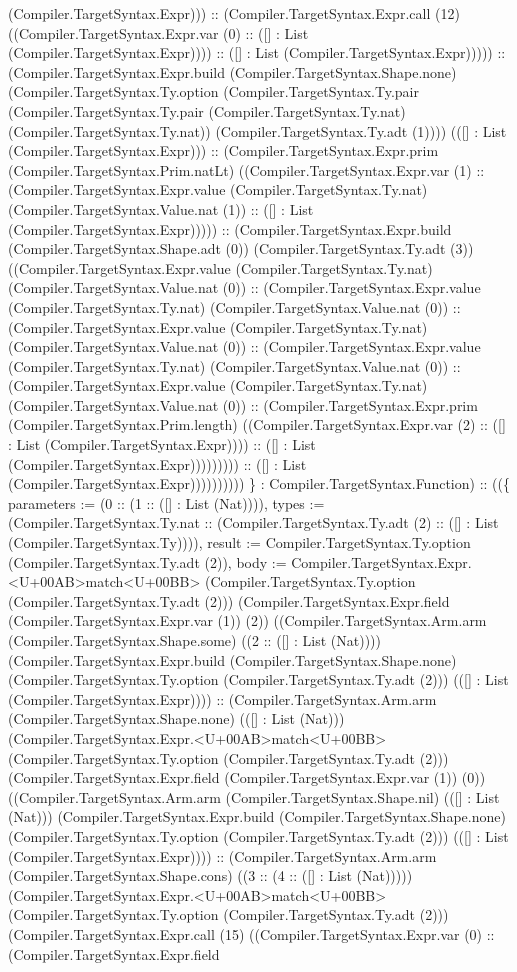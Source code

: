 \documentclass[11pt]{article}
\begin{document}
(Compiler.TargetSyntax.Expr))) :: (Compiler.TargetSyntax.Expr.call (12) ((Compiler.TargetSyntax.Expr.var (0) :: ([] : List (Compiler.TargetSyntax.Expr)))) :: ([] : List (Compiler.TargetSyntax.Expr))))) :: (Compiler.TargetSyntax.Expr.build (Compiler.TargetSyntax.Shape.none) (Compiler.TargetSyntax.Ty.option (Compiler.TargetSyntax.Ty.pair (Compiler.TargetSyntax.Ty.pair (Compiler.TargetSyntax.Ty.nat) (Compiler.TargetSyntax.Ty.nat)) (Compiler.TargetSyntax.Ty.adt (1)))) (([] : List (Compiler.TargetSyntax.Expr))) :: (Compiler.TargetSyntax.Expr.prim (Compiler.TargetSyntax.Prim.natLt) ((Compiler.TargetSyntax.Expr.var (1) :: (Compiler.TargetSyntax.Expr.value (Compiler.TargetSyntax.Ty.nat) (Compiler.TargetSyntax.Value.nat (1)) :: ([] : List (Compiler.TargetSyntax.Expr))))) :: (Compiler.TargetSyntax.Expr.build (Compiler.TargetSyntax.Shape.adt (0)) (Compiler.TargetSyntax.Ty.adt (3)) ((Compiler.TargetSyntax.Expr.value (Compiler.TargetSyntax.Ty.nat) (Compiler.TargetSyntax.Value.nat (0)) :: (Compiler.TargetSyntax.Expr.value (Compiler.TargetSyntax.Ty.nat) (Compiler.TargetSyntax.Value.nat (0)) :: (Compiler.TargetSyntax.Expr.value (Compiler.TargetSyntax.Ty.nat) (Compiler.TargetSyntax.Value.nat (0)) :: (Compiler.TargetSyntax.Expr.value (Compiler.TargetSyntax.Ty.nat) (Compiler.TargetSyntax.Value.nat (0)) :: (Compiler.TargetSyntax.Expr.value (Compiler.TargetSyntax.Ty.nat) (Compiler.TargetSyntax.Value.nat (0)) :: (Compiler.TargetSyntax.Expr.prim (Compiler.TargetSyntax.Prim.length) ((Compiler.TargetSyntax.Expr.var (2) :: ([] : List (Compiler.TargetSyntax.Expr)))) :: ([] : List (Compiler.TargetSyntax.Expr))))))))) :: ([] : List (Compiler.TargetSyntax.Expr)))))))))) \} : Compiler.TargetSyntax.Function) :: ((\{ parameters := (0 :: (1 :: ([] : List (Nat)))), types := (Compiler.TargetSyntax.Ty.nat :: (Compiler.TargetSyntax.Ty.adt (2) :: ([] : List (Compiler.TargetSyntax.Ty)))), result := Compiler.TargetSyntax.Ty.option (Compiler.TargetSyntax.Ty.adt (2)), body := Compiler.TargetSyntax.Expr.<U+00AB>match<U+00BB> (Compiler.TargetSyntax.Ty.option (Compiler.TargetSyntax.Ty.adt (2))) (Compiler.TargetSyntax.Expr.field (Compiler.TargetSyntax.Expr.var (1)) (2)) ((Compiler.TargetSyntax.Arm.arm (Compiler.TargetSyntax.Shape.some) ((2 :: ([] : List (Nat)))) (Compiler.TargetSyntax.Expr.build (Compiler.TargetSyntax.Shape.none) (Compiler.TargetSyntax.Ty.option (Compiler.TargetSyntax.Ty.adt (2))) (([] : List (Compiler.TargetSyntax.Expr)))) :: (Compiler.TargetSyntax.Arm.arm (Compiler.TargetSyntax.Shape.none) (([] : List (Nat))) (Compiler.TargetSyntax.Expr.<U+00AB>match<U+00BB> (Compiler.TargetSyntax.Ty.option (Compiler.TargetSyntax.Ty.adt (2))) (Compiler.TargetSyntax.Expr.field (Compiler.TargetSyntax.Expr.var (1)) (0)) ((Compiler.TargetSyntax.Arm.arm (Compiler.TargetSyntax.Shape.nil) (([] : List (Nat))) (Compiler.TargetSyntax.Expr.build (Compiler.TargetSyntax.Shape.none) (Compiler.TargetSyntax.Ty.option (Compiler.TargetSyntax.Ty.adt (2))) (([] : List (Compiler.TargetSyntax.Expr)))) :: (Compiler.TargetSyntax.Arm.arm (Compiler.TargetSyntax.Shape.cons) ((3 :: (4 :: ([] : List (Nat))))) (Compiler.TargetSyntax.Expr.<U+00AB>match<U+00BB> (Compiler.TargetSyntax.Ty.option (Compiler.TargetSyntax.Ty.adt (2))) (Compiler.TargetSyntax.Expr.call (15) ((Compiler.TargetSyntax.Expr.var (0) :: (Compiler.TargetSyntax.Expr.field 
\end{document}
